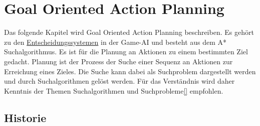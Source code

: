 \chapter{Goal Oriented Action Planning}
\label{chap:goap}

Das folgende Kapitel wird Goal Oriented Action Planning beschreiben. Es gehört zu den \hyperref[chap:entscheidungssysteme]{Entscheidungssystemen} in der Game-AI und besteht aus dem A* Suchalgorithmus. Es ist für die Planung an Aktionen zu einem bestimmten Ziel gedacht. Planung ist der Prozess der Suche einer Sequenz an Aktionen zur Erreichung eines Zieles. Die Suche kann dabei als Suchproblem dargestellt werden und durch Suchalgorithmen gelöst werden. Für das Verständnis wird daher Kenntnis der Themen Suchalgorithmen und Suchprobleme\ref{} empfohlen.


\section{Historie}
\label{chap:goap historie}

